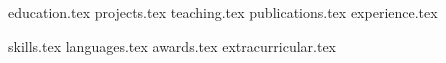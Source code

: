 \documentclass[letterpaper,11pt]{article}
\begin{document}


\vspace{-1cm}
{education.tex}
\vspace{-1.3cm}
{projects.tex}
{teaching.tex}
{publications.tex}
{experience.tex}

\pagebreak

\sidebyside
    {{skills.tex}}
    {{languages.tex}}
{awards.tex}
{extracurricular.tex}
\end{document}
